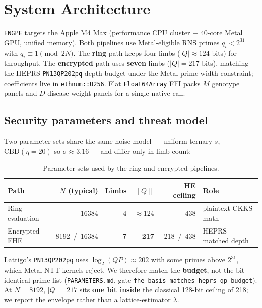 \documentclass[11pt,a4paper]{article}
\newcommand{\engpe}{\texttt{ENGPE}}
\DeclareRobustCommand{\code}[1]{\texttt{#1}}
\DeclareRobustCommand{\file}[1]{\texttt{#1}}
\newcommand{\longcode}[1]{{\urlstyle{tt}\nolinkurl{#1}}}
\begin{document}
\section{System Architecture}
\label{sec:arch}

\engpe{} targets the Apple M4 Max (performance CPU cluster + 40-core Metal GPU,
unified memory). Both pipelines use Metal-eligible RNS primes $q_i < 2^{31}$ with
$q_i \equiv 1 \pmod{2N}$. The \textbf{ring} path keeps four limbs
($|Q|\approx 124$ bits) for throughput. The \textbf{encrypted} path uses
\textbf{seven} limbs ($|Q| = 217$ bits), matching the HEPRS \code{PN13QP202pq}
depth budget under the Metal prime-width constraint; coefficients live in
\code{ethnum::U256}. Flat \code{Float64Array} FFI packs $M$ genotype panels and
$D$ disease weight panels for a single native call.

\setcounter{subsection}{-1}

\subsection{Security parameters and threat model}
\label{sec:security}

Two parameter sets share the same noise model --- uniform ternary $s$,
$\mathrm{CBD}(\eta = 20)$ so $\sigma \approx 3.16$ --- and differ only in limb
count:

\begin{table}[ht]
\centering
\caption{Parameter sets used by the ring and encrypted pipelines.}
\label{tab:params}
\small
\begin{tabular}{@{}lrrrrl@{}}
\toprule
Path & $N$ (typical) & Limbs & $\|Q\|$ & HE ceiling & Role \\
\midrule
Ring evaluation & 16384 & 4 & $\approx$124 & 438 & plaintext CKKS math \\
Encrypted FHE   & 8192~/~16384 & \textbf{7} & \textbf{217} & 218~/~438 & HEPRS-matched depth \\
\bottomrule
\end{tabular}
\end{table}

Lattigo's \code{PN13QP202pq} uses $\log_2(QP)\approx 202$ with some primes above
$2^{31}$, which Metal NTT kernels reject. We therefore match the \textbf{budget},
not the bit-identical prime list (\file{PARAMETERS.md}, gate
\longcode{fhe_basis_matches_heprs_qp_budget}). At $N = 8192$, $|Q| = 217$ sits
\textbf{one bit inside} the classical 128-bit ceiling of 218; we report the
envelope rather than a lattice-estimator $\lambda$.
\end{document}
